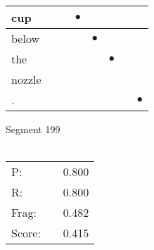 \documentclass[landscape]{article}
\newcommand{\ssp}{\hspace{2pt}}
\newcommand{\mex}{\cellcolor{g}$\bullet$}
\begin{document}
\begin{tabular}{|l|p{10pt}|p{10pt}|p{10pt}|p{10pt}|p{10pt}|p{10pt}|p{10pt}|}
\hline
\ssp \cellcolor{ref2}cup \ssp&\hspace{2pt}&\hspace{2pt}&\hspace{2pt}\mex&\hspace{2pt}&\hspace{2pt}&\hspace{2pt}&\hspace{2pt}\\
\hline
\ssp \cellcolor{ref3}below \ssp&\hspace{2pt}&\hspace{2pt}&\hspace{2pt}&\hspace{2pt}\mex&\hspace{2pt}&\hspace{2pt}&\hspace{2pt}\\
\hline
\ssp \cellcolor{ref4}the \ssp&\hspace{2pt}&\hspace{2pt}&\hspace{2pt}&\hspace{2pt}&\hspace{2pt}\mex&\hspace{2pt}&\hspace{2pt}\\
\hline
\ssp nozzle \ssp&\hspace{2pt}&\hspace{2pt}&\hspace{2pt}&\hspace{2pt}&\hspace{2pt}&\hspace{2pt}&\hspace{2pt}\\
\hline
\ssp \cellcolor{ref6}. \ssp&\hspace{2pt}&\hspace{2pt}&\hspace{2pt}&\hspace{2pt}&\hspace{2pt}&\hspace{2pt}&\hspace{2pt}\mex\\
\hline
\end{tabular}

\vspace{6pt}
\noindent Segment 199\\\\
\noindent\begin{tabular}{lm{12pt}r}
\hline
P:&&0.800\\
R:&&0.800\\
Frag:&&0.482\\
Score:&&0.415\\
\end{tabular}
\end{document}
